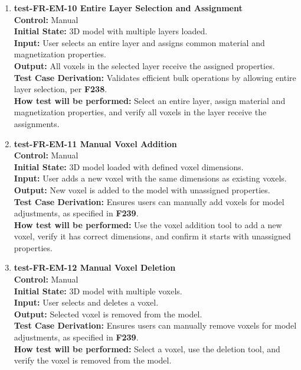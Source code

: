 \documentclass[12pt, titlepage]{article}
\begin{document}
\begin{enumerate}
  \item \textbf{test-FR-EM-10 Entire Layer Selection and Assignment} \\[2mm]
    \textbf{Control:} Manual \\ 
    \textbf{Initial State:} 3D model with multiple layers loaded. \\ 
    \textbf{Input:} User selects an entire layer and assigns common material and magnetization properties. \\ 
    \textbf{Output:} All voxels in the selected layer receive the assigned properties. \\[2mm]
    \textbf{Test Case Derivation:} Validates efficient bulk operations by allowing entire layer selection, per \textbf{F238}. \\[2mm]
    \textbf{How test will be performed:} Select an entire layer, assign material and magnetization properties, and verify all voxels in the layer receive the assignments.

  \item \textbf{test-FR-EM-11 Manual Voxel Addition} \\[2mm]
    \textbf{Control:} Manual \\ 
    \textbf{Initial State:} 3D model loaded with defined voxel dimensions. \\ 
    \textbf{Input:} User adds a new voxel with the same dimensions as existing voxels. \\ 
    \textbf{Output:} New voxel is added to the model with unassigned properties. \\[2mm]
    \textbf{Test Case Derivation:} Ensures users can manually add voxels for model adjustments, as specified in \textbf{F239}. \\[2mm]
    \textbf{How test will be performed:} Use the voxel addition tool to add a new voxel, verify it has correct dimensions, and confirm it starts with unassigned properties.

  \item \textbf{test-FR-EM-12 Manual Voxel Deletion} \\[2mm]
    \textbf{Control:} Manual \\ 
    \textbf{Initial State:} 3D model with multiple voxels. \\ 
    \textbf{Input:} User selects and deletes a voxel. \\ 
    \textbf{Output:} Selected voxel is removed from the model. \\[2mm]
    \textbf{Test Case Derivation:} Ensures users can manually remove voxels for model adjustments, as specified in \textbf{F239}. \\[2mm]
    \textbf{How test will be performed:} Select a voxel, use the deletion tool, and verify the voxel is removed from the model.


\end{enumerate}
\end{document}
